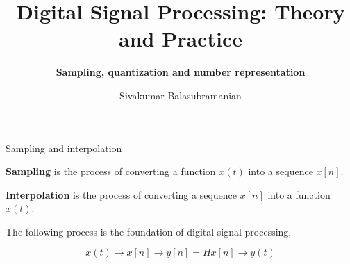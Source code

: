 \documentclass{beamer}
\title{Digital Signal Processing: Theory and Practice}
\subtitle{\textbf{Sampling, quantization and number representation}}
\author{Sivakumar Balasubramanian}
\institute[Christian Medical College] %
{
  \inst{}%
  Department of Bioengineering\\
  Christian Medical College, Bagayam\\
  Vellore 632002
}
\date{}
\begin{document}
\begin{frame}
  \titlepage
\end{frame}

\begin{frame}{Sampling and interpolation}

\textbf{Sampling} is the process of converting a function $x(t)$ into a sequence $x[n]$.
\vspace{0.2in}

\textbf{Interpolation} is the process of converting a sequence $x[n]$ into a function $x(t)$.
\vspace{0.2in}

The following process is the foundation of digital signal processing,
	
\[ x(t) \longrightarrow x[n] \longrightarrow y[n] = H x[n] \longrightarrow y(t) \]

\end{frame}
%
%
%
%
%
%
%
\end{document}

